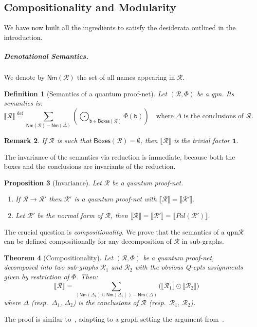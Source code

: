 \documentclass[10pt,a4paper]{article}
\newcommand*{\resp}{resp.}
\newcommand*{\defeq}{\stackrel{\text{def}}{=}}
\newcommand*{\difset}{\mathrel{-}}
\newcommand{\Nm}[1]{\mathsf{Nm}(#1)}
\newcommand*{\somepn}{\mathcal{R}}
\newcommand{\bbox}{\mathtt{b}}
\newcommand{\Boxes}[1]{\mathsf{Boxes}(#1)}
\newcommand{\pol}[1]{\mathit{Pol}({#1})}
\newcommand{\Red}[1][]{\xrightarrow{#1}}
\newcommand{\den}[1]{\llbracket{#1}\rrbracket}
\newcommand{\ftone}{\mathbf{1}}
\newcommand*{\qCPTs}{Q-\textsf{cpt}s\xspace}
\newcommand*{\qpn}{quantum proof-net\xspace}
\newcommand*{\qbpn}{\textsf{qpn}\xspace}
\newtheorem{theorem}{Theorem}
\newtheorem{proposition}[theorem]{Proposition}
\newtheorem{definition}[theorem]{Definition}
\newtheorem{remark}[theorem]{Remark}
\begin{document}
\subsection{Compositionality and Modularity}
\label{sec:PNcompositionality}

We have now built all the ingredients to satisfy the desiderata outlined in the introduction.

\subparagraph{Denotational Semantics.}

We denote by $\Nm{\somepn}$ the set of all names appearing in $\somepn$.
\begin{definition}[Semantics of a \qpn]
\label{def:sem}
Let $(\somepn,\Phi)$ be a \qbpn.
Its semantics is:
\begin{equation*}
\den{\somepn} \defeq \sum_{\Nm{\somepn}\difset\Nm{\Delta}} \left(\bigodot_{\bbox\in \Boxes{\somepn}} \Phi(\bbox)\right)
\quad\text{where $\Delta$ is the conclusions of $\somepn$.}
\end{equation*}
\end{definition}

\begin{remark}\label{ex:var_ax}
If $\somepn$ is such that $\Boxes{\somepn}=\emptyset$, then $\den{\somepn}$ is the trivial factor $\ftone$.
\end{remark}

The invariance of the semantics via reduction is immediate, because both the boxes and the conclusions are invariants of the reduction.

\begin{proposition}[Invariance]
Let $\somepn$ be a \qpn.
\begin{enumerate}
\item
If $\somepn \Red \somepn'$ then $\somepn'$ is a \qpn with $\den{\somepn}=\den{\somepn'}$.
\item
Let $\somepn'$ be the normal form of $\somepn$, then $\den{\somepn} = \den{\somepn'}= \den {\pol{\somepn'}}$.
\end{enumerate}
\end{proposition}

The crucial question is \emph{compositionality}.
We prove that the semantics of a \qbpn $\somepn$ can be defined compositionally for any decomposition of $\somepn$ in sub-graphs.


\begin{theorem}[Compositionality]
\label{th:compositional}
Let $(\somepn,\Phi)$ be a \qpn, decomposed into two sub-graphs $\somepn_1$ and $\somepn_2$ with the obvious \qCPTs assignments given by restriction of $\Phi$.
Then:
\begin{equation*}
\den{\somepn} = \sum_{(\Nm{\Delta_1} \cup \Nm{\Delta_2})\difset\Nm{\Delta}} \big(\den{\somepn_1} \odot \den{\somepn_2}\big)
\end{equation*}
where $\Delta$ (\resp\ $\Delta_1$, $\Delta_2$) is the conclusions of $\somepn$ (\resp\ $\somepn_1$, $\somepn_2$).
\end{theorem}
The proof is similar to~\cite{BPN}, adapting to a graph setting the argument from~\cite{popl24}.
\end{document}
